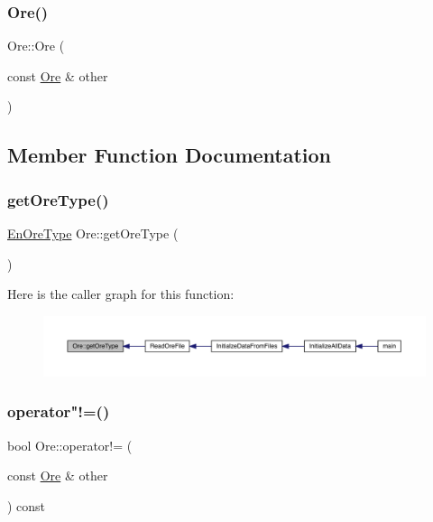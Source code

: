 \mbox{\label{class_ore_a06914cddcedb828081b0183a46db6ac5}} 
\subsubsection{\texorpdfstring{Ore()}{Ore()}\hspace{0.1cm}{\footnotesize\ttfamily [2/2]}}
{\footnotesize\ttfamily Ore\+::\+Ore (\begin{DoxyParamCaption}\item[{const \mbox{\hyperlink{class_ore}{Ore}} \&}]{other }\end{DoxyParamCaption})}



\subsection{Member Function Documentation}
\mbox{\label{class_ore_a77e26bca7317ab83d19dbf8695bcebb6}} 
\subsubsection{\texorpdfstring{get\+Ore\+Type()}{getOreType()}}
{\footnotesize\ttfamily \mbox{\hyperlink{_ore_8hpp_a4dd6f8b19eecee73049dd69be5803f14}{En\+Ore\+Type}} Ore\+::get\+Ore\+Type (\begin{DoxyParamCaption}{ }\end{DoxyParamCaption})}

Here is the caller graph for this function\+:
\nopagebreak
\begin{figure}[H]
\begin{center}
\leavevmode
\includegraphics[width=350pt]{d7/d51/class_ore_a77e26bca7317ab83d19dbf8695bcebb6_icgraph}
\end{center}
\end{figure}
\mbox{\label{class_ore_ac00c9de7ec899518c864199a18b52eac}} 
\subsubsection{\texorpdfstring{operator"!=()}{operator!=()}}
{\footnotesize\ttfamily bool Ore\+::operator!= (\begin{DoxyParamCaption}\item[{const \mbox{\hyperlink{class_ore}{Ore}} \&}]{other }\end{DoxyParamCaption}) const}

